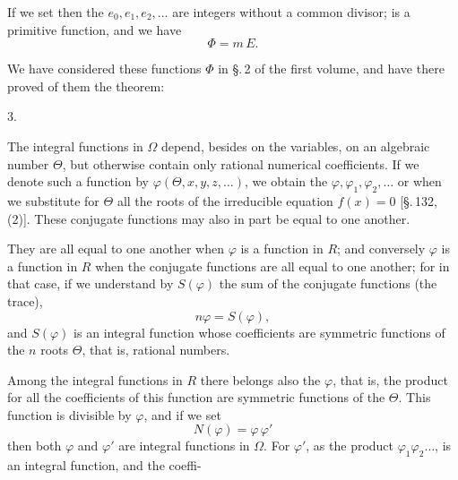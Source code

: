 
If we set
then the $e_0, e_1, e_2, \ldots$ are integers without a common divisor;
is a primitive function, and we have
\[ \Phi = m\,E. \]

We have considered these functions $\Phi$ in \S.\,2 of the first volume, and have there proved of them the theorem:

3. 

The integral functions in $\Omega$ depend, besides on the variables, on an algebraic number $\Theta$, but otherwise contain only rational numerical coefficients. If we denote such a function by $\varphi(\Theta, x, y, z, \ldots)$, we obtain the  $\varphi, \varphi_1, \varphi_2, \ldots$ or
when we substitute for $\Theta$ all the roots of the irreducible equation $f(x)=0$ [\S.\,132, (2)]. These conjugate functions may also in part be equal to one another.

They are all equal to one another when $\varphi$ is a function in $R$; and conversely $\varphi$ is a function in $R$ when the conjugate functions are all equal to one another; for in that case, if we understand by $S(\varphi)$ the sum of the conjugate functions (the trace),
\[ n\varphi = S(\varphi), \]
and $S(\varphi)$ is an integral function whose coefficients are symmetric functions of the $n$ roots $\Theta$, that is, rational numbers.

Among the integral functions in $R$ there belongs also the  $\varphi$, that is, the product
for all the coefficients of this function are symmetric functions of the $\Theta$. This function is divisible by $\varphi$, and if we set
\[ N(\varphi) = \varphi\,\varphi' \]
then both $\varphi$ and $\varphi'$ are integral functions in $\Omega$. For $\varphi'$, as the product $\varphi_1\varphi_2\ldots$, is an integral function, and the coeffi-
